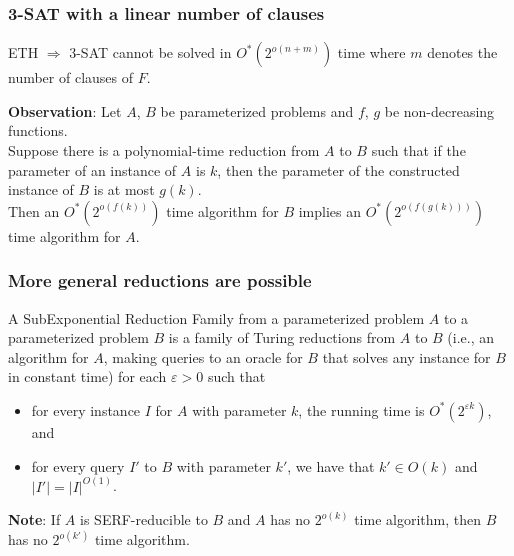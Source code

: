 \begin{frame}
 \frametitle{3-SAT with a linear number of clauses}
 
 \begin{corollary}
  ETH $\Rightarrow$ 3-SAT cannot be solved in $O^*(2^{o(n+m)})$ time where $m$ denotes the number of clauses of $F$.
 \end{corollary}
 
 \noindent
 \textbf{Observation}: Let $A$, $B$ be parameterized problems and $f$, $g$ be non-decreasing functions.\\
 Suppose there is a polynomial-time reduction from $A$ to $B$ such that if the parameter of an instance of $A$ is $k$, then the parameter of the constructed instance of $B$ is at most $g(k)$.\\
 Then an $O^*(2^{o(f(k))})$ time algorithm for $B$ implies an $O^*(2^{o(f(g(k)))})$ time algorithm for $A$.

\end{frame}

\begin{frame}
 \frametitle{More general reductions are possible}
 
 \begin{definition}
  A \alert{SubExponential Reduction Family} from a parameterized problem $A$ to a parameterized problem $B$ is a family of \alert{Turing reductions} from $A$ to $B$ (i.e., an algorithm for $A$, making queries to an \alert{oracle} for $B$ that solves any instance for $B$ in constant time) for each $\varepsilon >0$ such that
  \begin{itemize}
   \item for every instance $I$ for $A$ with parameter $k$, the running time is $O^*(2^{\varepsilon k})$, and
   \item for every query $I'$ to $B$ with parameter $k'$, we have that $k' \in O(k)$ and $|I'|=|I|^{O(1)}$.
  \end{itemize}
 \end{definition}

 \noindent
 \textbf{Note}: If $A$ is SERF-reducible to $B$ and $A$ has no $2^{o(k)}$ time algorithm, then $B$ has no $2^{o(k')}$ time algorithm.
\end{frame}



